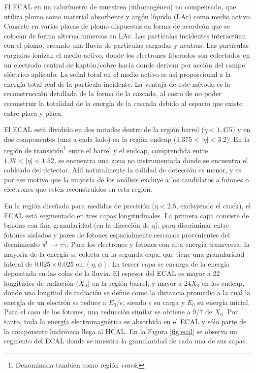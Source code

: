El ECAL en un calorímetro de muestreo (inhomogéneo) no compensado, que utiliza plomo como material absorbente y argón líquido (LAr) como medio activo. Consiste en varias placas de plomo dispuestas en forma de acordeón que se colocan de forma alterna inmersas en LAr. Las partículas incidentes interactúan con el plomo, creando una lluvia de partículas cargadas y neutras. Las partículas cargadas ionizan el medio activo, donde los electrones liberados son colectados en un electrodo central de kaptón/cobre hacia donde derivan por acción del campo eléctrico aplicado. La señal total en el medio activo es así proporcional a la energía total real de la partícula incidente. La ventaja de este método es la reconstrucción detallada de la forma de la cascada, al costo de no poder reconstruir la totalidad de la energía de la cascada debido al espacio que existe entre placa y placa.


El ECAL está dividido en dos mitades dentro de la región barrel ($\eta < 1.475$) y en dos componentes (una a cada lado) en la región endcap ($1.375 < |\eta| < 3.2$). 
En la región de transición\footnote{Denominada también como región \textit{crack}.} entre el barrel y el endcap, comprendida entre $1.37 < |\eta| < 1.52$, se encuentra una zona no instrumentada donde se encuentra el cableado del detector. 
Allí naturalmente la calidad de detección es menor, y es por ese motivo que la mayoría de los análisis excluye a los candidatos a fotones o electrones que estén reconstruidos en esta región.

En la región diseñada para medidas de precisión ($\eta < 2.5$, excluyendo el crack),
el ECAL está segmentado en tres capas longitudinales. La primera capa consiste de
bandas con fina granularidad (en la dirección de $\eta$), para discriminar entre fotones
aislados y pares de fotones espacialmente cercanos provenientes del decaimiento
$\pi^0\to\gamma\gamma$. Para los electrones y fotones con alta energía transversa, la mayoría
de la energía se colecta en la segunda capa, que tiene una granularidad lateral de
$0.025 \times 0.025$ en $(\eta, \phi)$. La tercer capa se encarga de la energía depositada en las
colas de la lluvia.
El espesor del ECAL es mayor a 22 longitudes de radiación ($X_0$) en la región
barrel, y mayor a $24X_0$ en los endcap, donde una longitud de radiación se define
como la distancia promedio a la cual la energía de un electrón se reduce a $E_0/e$, siendo $e$ su carga y $E_0$ su energía inicial. Para el caso de los fotones, una reducción similar se obtiene a
$9/7$ de $X_0$. Por tanto, toda la energía electromagnética es absorbida en el ECAL y
sólo parte de la componente hadrónica llega al HCAL. En la Figura \ref{fig:ecal} se observa un segmento del ECAL donde se muestra la granularidad de cada una de sus capas.

